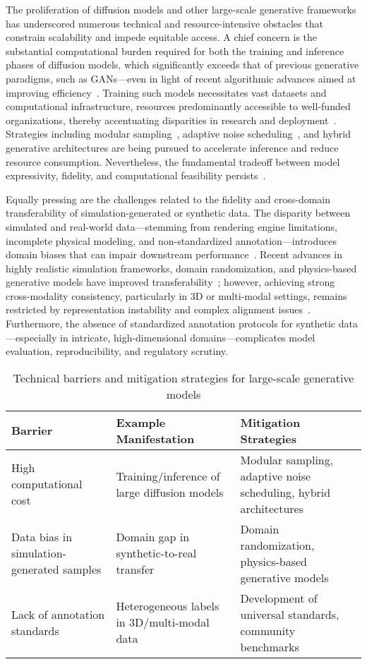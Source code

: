 \documentclass[11pt]{article}
\begin{document}
The proliferation of diffusion models and other large-scale generative frameworks has underscored numerous technical and resource-intensive obstacles that constrain scalability and impede equitable access. A chief concern is the substantial computational burden required for both the training and inference phases of diffusion models, which significantly exceeds that of previous generative paradigms, such as GANs—even in light of recent algorithmic advances aimed at improving efficiency~\cite{12,15,22,24,25,27,28,29,30,31,34,35,36,43,51,52,53,61,62,63,64,65,71,73,74,76,78,79,80,81,82,90,101,102}. Training such models necessitates vast datasets and computational infrastructure, resources predominantly accessible to well-funded organizations, thereby accentuating disparities in research and deployment~\cite{12,25,30,31,51,62,63,90}. Strategies including modular sampling~\cite{35}, adaptive noise scheduling~\cite{101}, and hybrid generative architectures are being pursued to accelerate inference and reduce resource consumption. Nevertheless, the fundamental tradeoff between model expressivity, fidelity, and computational feasibility persists~\cite{22,30,71,90}.

Equally pressing are the challenges related to the fidelity and cross-domain transferability of simulation-generated or synthetic data. The disparity between simulated and real-world data—stemming from rendering engine limitations, incomplete physical modeling, and non-standardized annotation—introduces domain biases that can impair downstream performance~\cite{81,89,90,91}. Recent advances in highly realistic simulation frameworks, domain randomization, and physics-based generative models have improved transferability~\cite{89,91}; however, achieving strong cross-modality consistency, particularly in 3D or multi-modal settings, remains restricted by representation instability and complex alignment issues~\cite{81,90,91}. Furthermore, the absence of standardized annotation protocols for synthetic data—especially in intricate, high-dimensional domains—complicates model evaluation, reproducibility, and regulatory scrutiny.

\begin{table}[ht]
\centering
\caption{Technical barriers and mitigation strategies for large-scale generative models}
\label{tab:barriers_mitigation}
\begin{tabular}{|p{4cm}|p{4cm}|p{6cm}|}
\hline
\textbf{Barrier} & \textbf{Example Manifestation} & \textbf{Mitigation Strategies} \\
\hline
High computational cost & Training/inference of large diffusion models & Modular sampling, adaptive noise scheduling, hybrid architectures \\
\hline
Data bias in simulation-generated samples & Domain gap in synthetic-to-real transfer & Domain randomization, physics-based generative models \\
\hline
Lack of annotation standards & Heterogeneous labels in 3D/multi-modal data & Development of universal standards, community benchmarks \\
\hline
\end{tabular}
\end{table}
\end{document}
